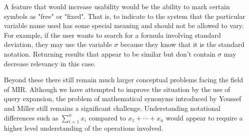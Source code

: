 \documentclass{sig-alternate}
\begin{document}
A feature that would increase usability would be the ability to mark certain symbols as "free" or "fixed". That is, to
indicate to the system that the particular variable name used has some special meaning and should not be allowed
to vary. For example, if the user wants to search for a formula involving standard deviation, they may use the
variable $\sigma$ because they know that it is the standard notation. Returning results that appear to be similar but don't
contain $\sigma$ may decrease relevancy in this case.

Beyond these there still remain much larger conceptual problems facing the field of MIR. Although we have attempted to
improve the situation by the use of query expansion, the problem of mathematical synonyms introduced by Youssef and Miller still remains a significant challenge. Understanding notational differences such as $\sum_{i=1}^{n}x_i$ compared to
$x_1 + \cdots + x_n$ would appear to require a higher level understanding of the operations involved. 

%


\appendix
\end{document}
